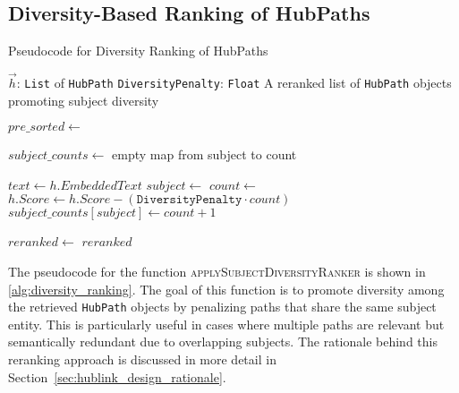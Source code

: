 \subsection{Diversity-Based Ranking of HubPaths}
\label{sec:hublink_pseudocode_diversity_ranker}

\begin{algorithm}[t]
\caption{Pseudocode for Diversity Ranking of HubPaths}
\label{alg:diversity_ranking}
\begin{algorithmic}[1]
\Require 
    \Statex $\vec{h}$: \texttt{List} of \texttt{HubPath} 
    \Statex \texttt{DiversityPenalty}: \texttt{Float} 
\Ensure
    \Statex A reranked list of \texttt{HubPath} objects promoting subject diversity

    \State $pre\_sorted \gets$  

    \State $subject\_counts \gets$ empty map from subject to count

        \State $text \gets h.EmbeddedText$
        \State $subject \gets$  
            \State $count \gets$ 
            \State $h.Score \gets h.Score - (\texttt{DiversityPenalty} \cdot count)$
            \State $subject\_counts[subject] \gets count + 1$
        \EndIf
    \EndFor
        
    \State $reranked \gets$  
    \State \Return $reranked$

\EndFunction
\end{algorithmic}
\end{algorithm}

The pseudocode for the function \textsc{applySubjectDiversityRanker} is shown in \autoref{alg:diversity_ranking}. The goal of this function is to promote diversity among the retrieved \texttt{HubPath} objects by penalizing paths that share the same subject entity. This is particularly useful in cases where multiple paths are relevant but semantically redundant due to overlapping subjects. The rationale behind this reranking approach is discussed in more detail in Section~\ref{sec:hublink_design_rationale}.


